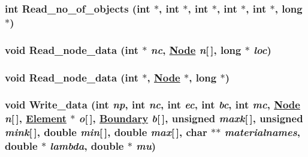 \hypertarget{oldpreprocess_8C_a2}{
\subsubsection[Read\_\-no\_\-of\_\-objects]{\setlength{\rightskip}{0pt plus 5cm}int Read\_\-no\_\-of\_\-objects (int $\ast$, int $\ast$, int $\ast$, int $\ast$, int $\ast$, long $\ast$)}}
\label{oldpreprocess_8C_a2}


\hypertarget{oldpreprocess_8C_a11}{
\subsubsection[Read\_\-node\_\-data]{\setlength{\rightskip}{0pt plus 5cm}void Read\_\-node\_\-data (int $\ast$ {\em nc}, \hyperlink{classNode}{Node} {\em n}\mbox{[}$\,$\mbox{]}, long $\ast$ {\em loc})}}
\label{oldpreprocess_8C_a11}


\hypertarget{oldpreprocess_8C_a3}{
\subsubsection[Read\_\-node\_\-data]{\setlength{\rightskip}{0pt plus 5cm}void Read\_\-node\_\-data (int $\ast$, \hyperlink{classNode}{Node} $\ast$, long $\ast$)}}
\label{oldpreprocess_8C_a3}


\hypertarget{oldpreprocess_8C_a14}{
\subsubsection[Write\_\-data]{\setlength{\rightskip}{0pt plus 5cm}void Write\_\-data (int {\em np}, int {\em nc}, int {\em ec}, int {\em bc}, int {\em mc}, \hyperlink{classNode}{Node} {\em n}\mbox{[}$\,$\mbox{]}, \hyperlink{classElement}{Element} $\ast$ {\em o}\mbox{[}$\,$\mbox{]}, \hyperlink{classBoundary}{Boundary} {\em b}\mbox{[}$\,$\mbox{]}, unsigned {\em maxk}\mbox{[}$\,$\mbox{]}, unsigned {\em mink}\mbox{[}$\,$\mbox{]}, double {\em min}\mbox{[}$\,$\mbox{]}, double {\em max}\mbox{[}$\,$\mbox{]}, char $\ast$$\ast$ {\em materialnames}, double $\ast$ {\em lambda}, double $\ast$ {\em mu})}}
\label{oldpreprocess_8C_a14}


